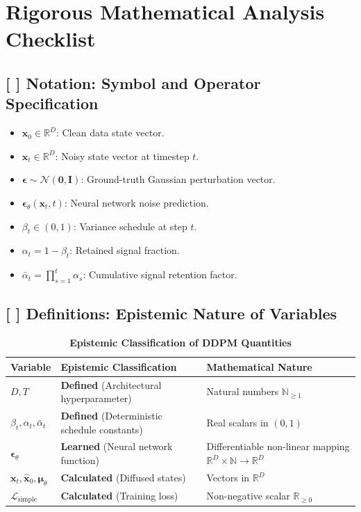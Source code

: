 \documentclass[11pt,a4paper]{article}
\theoremstyle{definition}
\begin{document}
\section{Rigorous Mathematical Analysis Checklist}

\subsection{[ ] Notation: Symbol and Operator Specification}
\begin{itemize}
    \item $\mathbf{x}_0 \in \mathbb{R}^D$: Clean data state vector.
    \item $\mathbf{x}_t \in \mathbb{R}^D$: Noisy state vector at timestep $t$.
    \item $\boldsymbol{\epsilon} \sim \mathcal{N}(\mathbf{0}, \mathbf{I})$: Ground-truth Gaussian perturbation vector.
    \item $\boldsymbol{\epsilon}_\theta(\mathbf{x}_t, t)$: Neural network noise prediction.
    \item $\beta_t \in (0, 1)$: Variance schedule at step $t$.
    \item $\alpha_t = 1 - \beta_t$: Retained signal fraction.
    \item $\bar{\alpha}_t = \prod_{s=1}^t \alpha_s$: Cumulative signal retention factor.
\end{itemize}

\subsection{[ ] Definitions: Epistemic Nature of Variables}
\begin{table}[h]
\centering
\caption{\textbf{Epistemic Classification of DDPM Quantities}}
\begin{tabular}{lll}
\toprule
\textbf{Variable} & \textbf{Epistemic Classification} & \textbf{Mathematical Nature} \\
\midrule
$D, T$ & \textbf{Defined} (Architectural hyperparameter) & Natural numbers $\mathbb{N}_{\ge 1}$ \\
$\beta_t, \alpha_t, \bar{\alpha}_t$ & \textbf{Defined} (Deterministic schedule constants) & Real scalars in $(0, 1)$ \\
$\boldsymbol{\epsilon}_\theta$ & \textbf{Learned} (Neural network function) & Differentiable non-linear mapping $\mathbb{R}^D \times \mathbb{N} \to \mathbb{R}^D$ \\
$\mathbf{x}_t, \hat{\mathbf{x}}_0, \boldsymbol{\mu}_\theta$ & \textbf{Calculated} (Diffused states) & Vectors in $\mathbb{R}^D$ \\
$\mathcal{L}_{\text{simple}}$ & \textbf{Calculated} (Training loss) & Non-negative scalar $\mathbb{R}_{\ge 0}$ \\
\bottomrule
\end{tabular}
\end{table}
\end{document}
